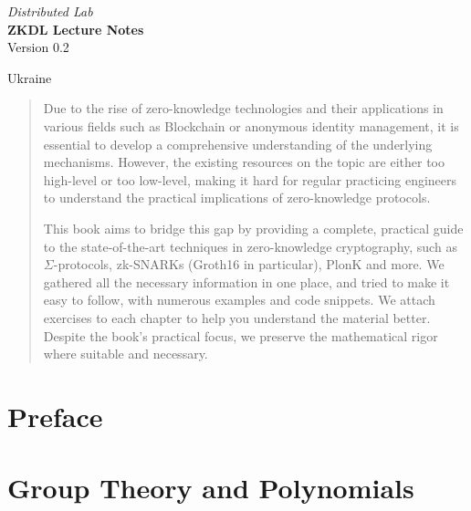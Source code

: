 \documentclass{zkdl-template}
\def\maketitle{
    \begin{center}
        {\Large\sffamily \emph{Distributed Lab}} \\ \vspace{30mm}
        {\huge\sffamily\bfseries ZKDL Lecture Notes} \\ \vspace{5mm}
        {Version 0.2} \\ \vspace{10mm}
    \end{center}
    
    \vfill

    \begin{center}
        {Ukraine} \\ \vspace{2mm}
        {\sffamily \the\year}
    \end{center}

    \thispagestyle{empty}
    \pagebreak
}
\begin{document}
    \maketitle

    \pagecolor{white}

    \vspace*{\fill}

    \begin{abstract}
        \fontsize{10}{12}\selectfont
        Due to the rise of zero-knowledge technologies and their applications in
        various fields such as Blockchain or anonymous identity management, it is
        essential to develop a comprehensive understanding of the underlying
        mechanisms. However, the existing resources on the topic are either too
        high-level or too low-level, making it hard for regular practicing engineers
        to understand the practical implications of zero-knowledge protocols.
    
        This book aims to bridge this gap by providing a complete, practical guide
        to the state-of-the-art techniques in zero-knowledge cryptography, such as
        $\Sigma$-protocols, zk-SNARKs (Groth16 in particular), PlonK and more. We
        gathered all the necessary information in one place, and tried to make it
        easy to follow, with numerous examples and code snippets. We attach
        exercises to each chapter to help you understand the material better.
        Despite the book's practical focus, we preserve the mathematical rigor where
        suitable and necessary.
    \end{abstract}
    
    \vspace*{\fill}

    \thispagestyle{empty}
    \newpage

    \pagestyle{fancy}
    \pagecolor{white}

    \tableofcontents

\pagebreak


\section*{Preface}



\section{Group Theory and Polynomials}\label{section:math-crypto-1}
\end{document}
